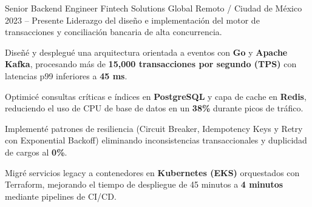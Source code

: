 %
%
%
%
%


\cvExperienceItem
    {Senior Backend Engineer}
    {Fintech Solutions Global}
    {Remoto / Ciudad de México}
    {2023 -- Presente}
    {Liderazgo del diseño e implementación del motor de transacciones y conciliación bancaria de alta concurrencia.}
    {
        \begin{cvItemize}
            \item Diseñé y desplegué una arquitectura orientada a eventos con \textbf{Go} y \textbf{Apache Kafka}, procesando más de \textbf{15,000 transacciones por segundo (TPS)} con latencias p99 inferiores a \textbf{45 ms}.
            \item Optimicé consultas críticas e índices en \textbf{PostgreSQL} y capa de cache en \textbf{Redis}, reduciendo el uso de CPU de base de datos en un \textbf{38\%} durante picos de tráfico.
            \item Implementé patrones de resiliencia (Circuit Breaker, Idempotency Keys y Retry con Exponential Backoff) eliminando inconsistencias transaccionales y duplicidad de cargos al \textbf{0\%}.
            \item Migré servicios legacy a contenedores en \textbf{Kubernetes (EKS)} orquestados con Terraform, mejorando el tiempo de despliegue de 45 minutos a \textbf{4 minutos} mediante pipelines de CI/CD.
        \end{cvItemize}
    }

